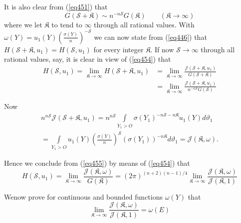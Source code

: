 It is also clear from (\ref{eq451}) that
\begin{equation*}
G(\mathscr{S}+\mathfrak{K}) \sim n^{-n\mathscr{S}}   G(\mathfrak{K})
\qquad (\mathfrak{K} \rightarrow \infty )  \tag{454}\label{eq454} 
\end{equation*}
where we let $\mathfrak{K}$ to tend to $\infty$ through all rational
values. With \break $\omega(Y) = u_1(Y)(\frac{\sigma(Y)}{n})^{-\mathscr{S}}$
we can now state from (\ref{eq446}) that $H(\mathscr{S}+\mathfrak{K},u_1) =
H(\mathscr{S},u_1)$ for every integer $\mathfrak{K}$. If now
$\mathscr{S} \rightarrow \infty$ through all rational \break values, say, it
is clear in view of (\ref{eq454}) that 
\begin{align*}
H(\mathscr{S},u_1) = \lim_{\mathfrak{K}\rightarrow \infty}
H(\mathscr{S}+\mathfrak{K},u_1) & = \lim_{\mathfrak{K} \rightarrow
  \infty}
\frac{\mathcal{J}(\mathscr{S}+\mathfrak{K},u_1)}{G(\mathscr{S}+
  \mathfrak{K})}\\ 
& = \lim_{\mathfrak{K}\rightarrow \infty}
\frac{\mathcal{J}(\mathscr{S}+\mathfrak{K},u_1)}{n^{-n\mathscr{S}}G(\mathscr{S})}
\tag{455}\label{eq455} 
\end{align*}

Now
\begin{gather*}
n^{n\mathscr{S}}   \mathcal{J}(\mathscr{S}+ \mathfrak{K},u_1) =
n^{n\mathscr{S}} \int\limits_{Y_1 > O}
\sigma(Y_1)^{-n\mathscr{S}-n\mathfrak{K}}   u_1(Y)   d\vartheta_1\\ 
= \int\limits_{Y_1 > O}   u_1(Y) (\frac{\sigma(Y)}{n})^{\mathscr{S}}
(\sigma(Y_1))^{-n\mathfrak{K}}   d\vartheta_1 =
\mathcal{J}(\mathfrak{K},\omega). 
\end{gather*}

Hence we conclude from (\ref{eq455}) by means of (\ref{eq454}) that 
\begin{equation*}
H(\mathscr{S},u_1) = \lim_{\mathfrak{K} \rightarrow \infty}
\frac{\mathcal{J}(\mathfrak{K},\omega)}{G(\mathfrak{K})} =
(2\pi)^{(n+2)(n-1)/4} \lim_{\mathfrak{K} \rightarrow \infty}
\frac{\mathcal{J}(\mathfrak{K},\omega)}{\mathscr{J}(\mathfrak{K},1)}
\tag{456}\label{eq456} 
\end{equation*}

We\pageoriginale now prove for continuous and bounded functions
$\omega(Y)$ that  
\begin{equation*}
\lim_{\mathfrak{K} \rightarrow \infty}
\frac{\mathcal{J}(\mathfrak{K},\omega)}{\mathcal{J}(\mathfrak{K},1)} =
\omega(E) \tag{457}\label{eq457} 
\end{equation*}

